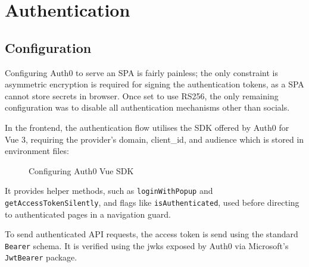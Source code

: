 \section{Authentication}

\subsection{Configuration}

Configuring Auth0 to serve an SPA is fairly painless; the
only constraint is asymmetric encryption is required for
signing the authentication tokens, as a SPA cannot store
secrets in browser.
Once set to use RS256, the only remaining configuration was
to disable all authentication mechanisms other than
socials.

In the frontend, the authentication flow utilises the SDK
offered by Auth0 for Vue 3, requiring the provider's
domain, client\_id, and audience which is stored in
environment files: 

\begin{figure}[H] 

  \centering 

  \small 

  

  \caption{Configuring Auth0 Vue SDK} 

\end{figure} 

It provides helper methods, such as
\lstinline{loginWithPopup} and
\lstinline{getAccessTokenSilently}, and flags like
\lstinline{isAuthenticated}, used before directing to
authenticated pages in a navigation guard.

To send authenticated API requests, the access token is
send using the standard \lstinline{Bearer} schema.
It is verified using the \gls{jwks} exposed by Auth0 via
Microsoft's \lstinline{JwtBearer} package.

